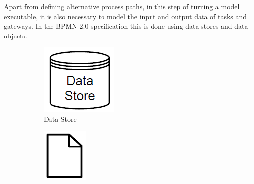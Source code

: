Apart from defining alternative process paths, in this step of turning a model executable, it is also necessary to model the input and output data of tasks and gateways. In the BPMN 2.0 specification this is done using \gls{data-store}s and \gls{data-object}s. 

\begin{figure}[H]
	\centering
	\begin{subfigure}[b]{0.18\columnwidth}
		\centering
		\includegraphics[width=0.9\columnwidth]{graphics/data-store}
		\caption{Data Store} 
		\label{fig:datastore} 
	\end{subfigure}
	\begin{subfigure}[b]{0.18\columnwidth}
		\centering
		\includegraphics[width=0.8\columnwidth]{graphics/data-object}

\end{subfigure}
\end{figure}
